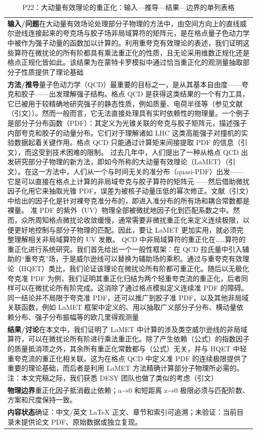 \documentclass[UTF8,11pt,oneside]{ctexbook}
\begin{document}
\begin{table}[htbp]
  \centering
  \caption*{P22：大动量有效理论的重正化：输入—推导—结果—边界的单列表格}
  \small
  \begin{tabular}{@{}p{}@{}}
    \toprule
    \textbf{输入/问题}\quad 在大动量有效场论处理部分子物理的方法中，由空间方向上的直线威尔逊线连接起来的夸克场与胶子场非局域算符的矩阵元，是在格点量子色动力学中被作为强子动量的函数加以计算的。利用重夸克有效理论的表述，我们证明这些算符在微扰论的所有阶都具有乘法重正化的性质，且无论采用维数正规化还是格点正规化皆如此。该结果为在蒙特卡罗模拟中通过恰当重正化的观测量抽取部分子性质提供了理论基础 \\
    \textbf{方法/推导}\quad 量子色动力学（QCD）最重要的目标之一，是从其基本自由度——夸克和胶子——出发理解强子结构。格点 QCD 是获得这类结果的一个有力工具，它已被用于较精确地研究强子的静态性质，例如质量、电荷半径等（参见文献（引文））。然而一般而言，它无法直接处理具有实时依赖性的物理量。一个例子是部分子分布函数（PDF）：其定义为光锥关联的夸克与胶子矩阵元，描述强子内部夸克和胶子的动量分布。它们对于理解诸如 LHC 这类高能强子对撞机的实验数据起着关键作用。格点 QCD 只能通过计算矩来间接提取 PDF 的信息（引文），而这受到技术困难的限制。 过去几年中，人们提出了一种从格点 QCD 出发研究部分子物理的新方法，即如今所称的大动量有效理论（LaMET）（引文）。在这一方法中，人们从一个与时间无关的准分布（quasi-PDF）出发——它是可以直接在格点上计算的非局域夸克与胶子算符的矩阵元——然后借助微扰因子化用它来抽取光锥 PDF，误差为被核子动量压低的幂次修正。文献（引文）中给出的因子化是针对裸夸克准分布的，即进入准分布的所有场和耦合常数都是裸量。 准 PDF 的紫外（UV）物理全部被微扰地因子化到匹配系数之中。然而，众所周知格点微扰论收敛缓慢，通常需要非微扰重正化来定义连续极限，以便更好地控制与部分子物理的匹配。因此，要让 LaMET 更加实用，就必须完整理解相关非局域算符的 UV 发散。 QCD 中非局域算符的重正化在……算符的重正化进行系统研究。我们首先给出一个一般性框架：在 QCD 拉氏量中引入辅助的“重夸克”场，于是威尔逊线可以替换为辅助场的乘积。通过与重夸克有效理论（HQET）类比，我们论证该理论在微扰论所有阶都可重正化。随后以无极化夸克准 PDF 为例，我们证明其重正化归结为两个轻重夸克流的重正化，后者同样可以在微扰论所有阶完成。这消除了通过格点模拟定义连续准 PDF 的障碍。同一结论并不局限于夸克准 PDF，还可以推广到胶子准 PDF，以及其他非局域关联函数，例如 LaMET 框架中定义的、用以抽取广义部分子分布、横动量依赖分布、强子分布振幅等的欧几里得观测量 \\
    \textbf{结果/讨论}\quad 在本文中，我们证明了 LaMET 中计算的涉及类空威尔逊线的非局域算符，可以在微扰论所有阶进行乘法重正化。除了产生依赖（公式）的指数因子的质量抵消项之外，其余所有重正化常数都与（公式）无关，并与 HQET 中轻重夸克流的重正化相关联。这为在格点 QCD 中定义准 PDF 的连续极限提供了重要的理论基础，而后者是利用 LaMET 方法精确计算部分子物理所必需的。 注：本文完稿之际，我们获悉 DESY 团队也做了类似的考虑（引文） \\
    \textbf{物理边界}\quad 重正化因子抵消截止依赖；a→0 和短距离 z→0 极限必须与匹配阶数、方案和尺度保持一致。 \\
    \textbf{内容状态}\quad 确证：中文/英文 LaTeX 正文、章节和索引可追溯；未验证：当前目录未提供论文 PDF、原始数据或独立复现。 \\
    \bottomrule
  \end{tabular}
\end{table}
\end{document}
